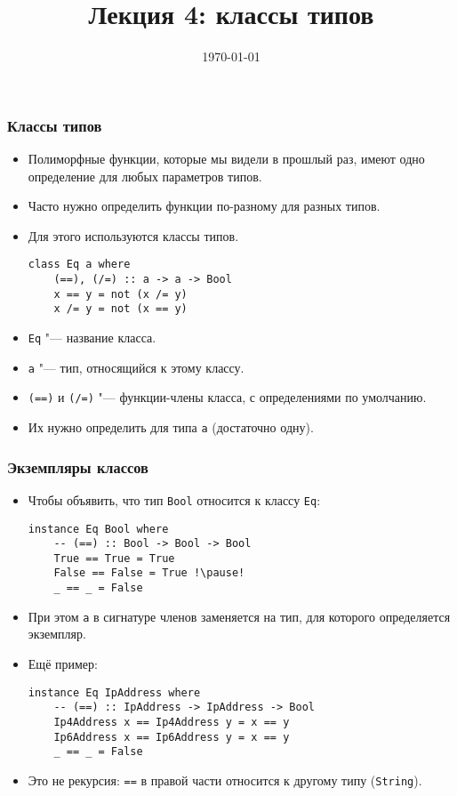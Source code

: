 \documentclass[10pt]{beamer}
\title{Лекция 4: классы типов}
\date{\today}
\begin{document}
\begin{frame}[plain]
\maketitle
\end{frame}

\begin{frame}[fragile]
\frametitle{Классы типов}
\begin{itemize}
    \item Полиморфные функции, которые мы видели в прошлый раз, имеют одно определение для любых параметров типов.
    \item Часто нужно определить функции по-разному для разных типов.
    \item Для этого используются классы типов.
\begin{lstlisting}[basicstyle=\ttfamily\small]
class Eq a where
    (==), (/=) :: a -> a -> Bool
    x == y = not (x /= y)
    x /= y = not (x == y)
\end{lstlisting}
    \item \lstinline|Eq| "--- название класса.
    \item \lstinline|a| "--- тип, относящийся к этому классу.
    \item \lstinline|(==)| и \lstinline|(/=)| "--- функции-члены класса, с определениями по умолчанию.
    \item Их нужно определить для типа \lstinline|a| \pause(достаточно одну).
\end{itemize}
\end{frame}

\begin{frame}[fragile]
\frametitle{Экземпляры классов}
\begin{itemize}
    \item Чтобы объявить, что тип \lstinline|Bool| относится к классу \lstinline|Eq|:
\begin{lstlisting}[basicstyle=\ttfamily\small]
instance Eq Bool where
    -- (==) :: Bool -> Bool -> Bool
    True == True = True
    False == False = True !\pause!
    _ == _ = False
\end{lstlisting}
    \item При этом \lstinline|a| в сигнатуре членов заменяется на тип, для которого определяется экземпляр.
    \item Ещё пример:\pause
\begin{lstlisting}[basicstyle=\ttfamily\small]
instance Eq IpAddress where
    -- (==) :: IpAddress -> IpAddress -> Bool
    Ip4Address x == Ip4Address y = x == y
    Ip6Address x == Ip6Address y = x == y
    _ == _ = False
\end{lstlisting}
    \item<4-> Это не рекурсия: \lstinline|==| в правой части относится к другому типу (\lstinline|String|).
\end{itemize}
\end{frame}
\end{document}

